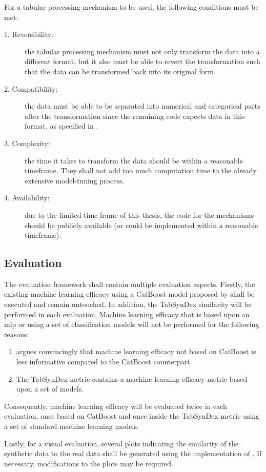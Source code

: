 For a tabular processing mechanism to be used, the following conditions must be met:

\begin{description}
	\item[1. Reversibility:] the tabular processing mechanism must not only transform the data into a different format, but it also must be able to revert the transformation
	      such that the data can be transformed back into its original form.
	\item[2. Compatibility:] the data must be able to be separated into numerical and categorical parts after the transformation
	      since the remaining code expects data in this format, as specified in .
	\item[3. Complexity:] the time it takes to transform the data should be within a reasonable timeframe. They shall not add too much computation time to the already extensive model-tuning process.
	\item[4. Availability:] due to the limited time frame of this thesis, the code for the mechanisms should be publicly available (or could be implemented within a reasonable timeframe).
\end{description}

\subsection[]{Evaluation}
\label{ch:conceptualDesign-Evaluation}
The evaluation framework shall contain multiple evaluation aspects.
Firstly, the existing machine learning efficacy using a CatBoost model proposed by \cite{kotelnikov2022TabDDPMModellingTabular} shall be executed and remain untouched.
In addition, the TabSynDex \cite{chundawat2022UniversalMetricRobust} similarity will be performed in each evaluation.
Machine learning efficacy that is based upon an \gls{mlp} or using a set of classification models will not be performed for the following reasons:
\begin{enumerate}
	\item \cite{kotelnikov2022TabDDPMModellingTabular} argues convincingly that machine learning efficacy not based on CatBoost is less informative compared to the CatBoost counterpart.
	\item The TabSynDex metric contains a machine learning efficacy metric based upon a set of models.
\end{enumerate}
Consequently, machine learning efficacy will be evaluated twice in each evaluation, once based on CatBoost and once inside the TabSynDex metric using a set of standard machine learning models.

Lastly, for a visual evaluation, several plots indicating the similarity of the synthetic data to the real data shall be generated using the implementation of \textcite{brenninkmeijer2019GenerationEvaluationTabular}.
If necessary, modifications to the plots may be required.


